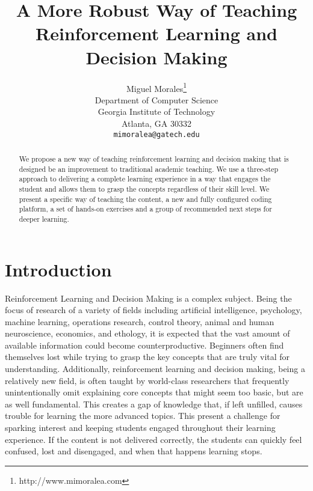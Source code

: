\documentclass[11pt]{article} %
\title{A More Robust Way of Teaching Reinforcement Learning and Decision Making}
\author{
Miguel Morales\thanks{http://www.mimoralea.com} \\
Department of Computer Science \\
Georgia Institute of Technology \\
Atlanta, GA 30332 \\
\texttt{mimoralea@gatech.edu} \\
}
\begin{document}
\maketitle

\begin{abstract}
   We propose a new way of teaching reinforcement learning and decision making
  that is designed be an improvement to traditional academic teaching. We use
  a three-step approach to delivering a complete learning experience in a
  way that engages the student and allows them to grasp the concepts regardless
  of their skill level. We present a specific way of teaching the content, a
  new and fully configured coding platform, a set of hands-on exercises and
  a group of recommended next steps for deeper learning.
\end{abstract}



\startmain %

\section{Introduction}

Reinforcement Learning and Decision Making is a complex subject. Being the
focus of research of a variety of fields including artificial intelligence,
psychology, machine learning, operations research, control theory, animal
and human neuroscience, economics, and ethology, it is expected that the
vast amount of available information could become counterproductive.
Beginners often find themselves lost while trying to grasp the key concepts
that are truly vital for understanding. Additionally, reinforcement learning
and decision making, being a relatively new field, is often taught by
world-class researchers that frequently unintentionally omit explaining
core concepts that might seem too basic, but are as well fundamental. This
creates a gap of knowledge that, if left unfilled, causes trouble for learning
the more advanced topics. This present a challenge for sparking interest and
keeping students engaged throughout their learning experience. If the content
is not delivered correctly, the students can quickly feel confused, lost and
disengaged, and when that happens learning stops.
\end{document}
